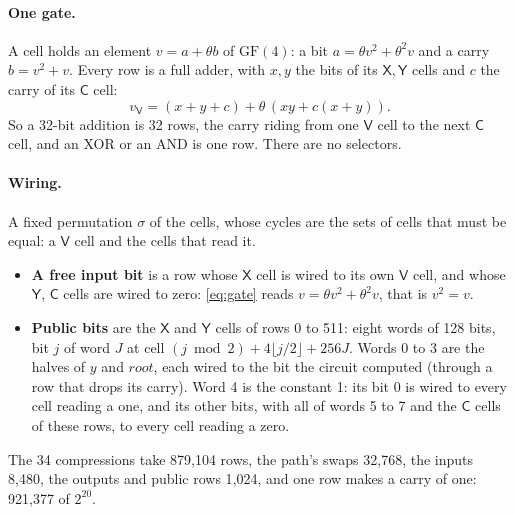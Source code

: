 \documentclass[11pt]{article}
\newcommand{\rootnode}{\mathit{root}}
\newcommand{\perm}{\sigma}
\begin{document}
\paragraph{One gate.} A cell holds an element $v = a + \theta b$ of $\mathrm{GF}(4)$: a bit $a = \theta v^2 + \theta^2 v$ and a carry $b = v^2 + v$. Every row is a full adder, with $x, y$ the bits of its $\mathsf X, \mathsf Y$ cells and $c$ the carry of its $\mathsf C$ cell:
\begin{equation}\label{eq:gate}
  v_{\mathsf V} = (x + y + c) + \theta \, (x y + c (x + y)) .
\end{equation}
So a 32-bit addition is 32 rows, the carry riding from one $\mathsf V$ cell to the next $\mathsf C$ cell, and an XOR or an AND is one row. There are no selectors.

\paragraph{Wiring.} A fixed permutation $\perm$ of the cells, whose cycles are the sets of cells that must be equal: a $\mathsf V$ cell and the cells that read it.
\begin{itemize}
  \item \textbf{A free input bit} is a row whose $\mathsf X$ cell is wired to its own $\mathsf V$ cell, and whose $\mathsf Y$, $\mathsf C$ cells are wired to zero: \eqref{eq:gate} reads $v = \theta v^2 + \theta^2 v$, that is $v^2 = v$.
  \item \textbf{Public bits} are the $\mathsf X$ and $\mathsf Y$ cells of rows 0 to 511: eight words of 128 bits, bit $j$ of word $J$ at cell $(j \bmod 2) + 4 \lfloor j / 2 \rfloor + 256 J$. Words 0 to 3 are the halves of $y$ and $\rootnode$, each wired to the bit the circuit computed (through a row that drops its carry). Word 4 is the constant 1: its bit 0 is wired to every cell reading a one, and its other bits, with all of words 5 to 7 and the $\mathsf C$ cells of these rows, to every cell reading a zero.
\end{itemize}
The 34 compressions take 879{,}104 rows, the path's swaps 32{,}768, the inputs 8{,}480, the outputs and public rows 1{,}024, and one row makes a carry of one: 921{,}377 of $2^{20}$.
\end{document}
